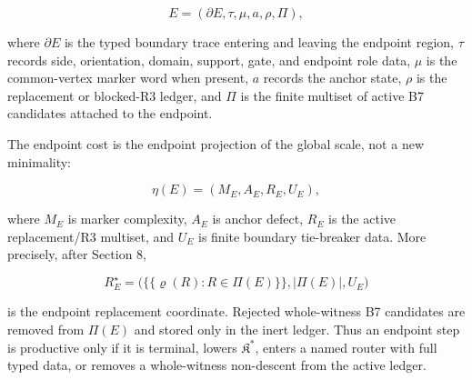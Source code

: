\documentclass[11pt]{amsart}
\theoremstyle{definition}
\begin{document}
\[
E=(\partial E,\tau,\mu,a,\rho,\Pi),
\]

where \(\partial E\) is the typed boundary trace entering and leaving the endpoint
region, \(\tau\) records side, orientation, domain, support, gate, and endpoint
role data, \(\mu\) is the common-vertex marker word when present, \(a\) records the
anchor state, \(\rho\) is the replacement or blocked-R3 ledger, and \(\Pi\) is the
finite multiset of active B7 candidates attached to the endpoint.

The endpoint cost is the endpoint projection of the global scale, not a new
minimality:

\[
\eta(E)=(M_E,A_E,R_E,U_E),
\]

where \(M_E\) is marker complexity, \(A_E\) is anchor defect, \(R_E\) is the active
replacement/R3 multiset, and \(U_E\) is finite boundary tie-breaker data. More
precisely, after Section 8,

\[
R_E^\star=
\bigl(\{\!\{\varrho(R):R\in\Pi(E)\}\!\},|\Pi(E)|,U_E\bigr)
\]

is the endpoint replacement coordinate. Rejected whole-witness B7 candidates are
removed from \(\Pi(E)\) and stored only in the inert ledger. Thus an endpoint step
is productive only if it is terminal, lowers \(\mathfrak K^\ast\), enters a named
router with full typed data, or removes a whole-witness non-descent from the
active ledger.
\end{document}
